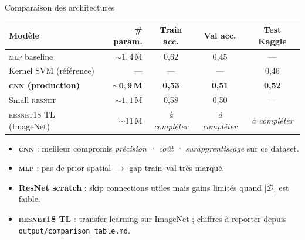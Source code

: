 \documentclass[10pt,aspectratio=169,professionalfonts]{beamer}
\newcommand{\bpoint}[1]{\item[\textcolor{#1}{$\blacktriangleright$}]}
\begin{document}
\begin{frame}{Comparaison des architectures}
  \vspace{-0.4em}
  \begin{center}
    \footnotesize
    \renewcommand{\arraystretch}{1.30}
    \setlength{\tabcolsep}{6pt}
    \begin{tabular}{@{}l r c c c@{}}
      \toprule
      \textbf{Modèle} & \textbf{\# param.} & \textbf{Train acc.} & \textbf{Val acc.} & \textbf{Test Kaggle} \\
      \midrule
      \textsc{mlp} baseline                & $\sim 1{,}4\,\mathrm{M}$ & 0{,}62 & 0{,}45 & --- \\
      Kernel SVM (référence)               & ---                      & ---    & ---    & 0{,}46 \\
      \textbf{\textcolor{Brand}{\textsc{cnn} (production)}} & $\mathbf{\sim 0{,}9\,M}$ & \textbf{0{,}53} & \textbf{0{,}51} & \textbf{0{,}52} \\
      Small \textsc{resnet}                & $\sim 1{,}1\,\mathrm{M}$ & 0{,}58 & 0{,}50 & --- \\
      \textsc{resnet18} TL (ImageNet)      & $\sim 11\,\mathrm{M}$    & \textit{à compléter} & \textit{à compléter} & \textit{à compléter} \\
      \bottomrule
    \end{tabular}
  \end{center}

  \vspace{0.5em}
  \begin{itemize}\small\setlength\itemsep{0.30em}
    \bpoint{Success} \textbf{\textsc{cnn}} : meilleur compromis \emph{précision · coût · surapprentissage} sur ce dataset.
    \bpoint{Warning} \textbf{\textsc{mlp}} : pas de prior spatial $\rightarrow$ gap train--val très marqué.
    \bpoint{Warning} \textbf{ResNet scratch} : skip connections utiles mais gains limités quand $|\mathcal{D}|$ est faible.
    \bpoint{Brand}   \textbf{\textsc{resnet18} TL} : transfer learning sur ImageNet ; chiffres à reporter depuis \texttt{output/comparison\_table.md}.
  \end{itemize}
\end{frame}
\end{document}
